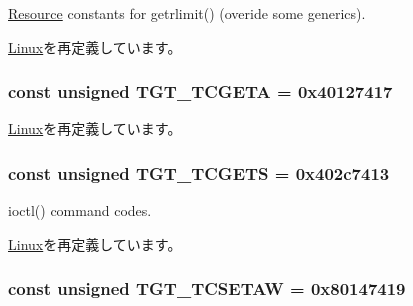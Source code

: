\hyperlink{classResource}{Resource} constants for getrlimit() (overide some generics). 

\hyperlink{classLinux_af16b609dcc51ebef365e8258e28d777c}{Linux}を再定義しています。\hypertarget{classAlphaLinux_a804fc265279c5dbd78e0f95da998b267}{
\subsubsection[{TGT\_\-TCGETA}]{\setlength{\rightskip}{0pt plus 5cm}const unsigned {\bf TGT\_\-TCGETA} = 0x40127417}}
\label{classAlphaLinux_a804fc265279c5dbd78e0f95da998b267}


\hyperlink{classLinux_a804fc265279c5dbd78e0f95da998b267}{Linux}を再定義しています。\hypertarget{classAlphaLinux_a50e5d880569ec2cb9a2f3d4aaa55cc64}{
\subsubsection[{TGT\_\-TCGETS}]{\setlength{\rightskip}{0pt plus 5cm}const unsigned {\bf TGT\_\-TCGETS} = 0x402c7413}}
\label{classAlphaLinux_a50e5d880569ec2cb9a2f3d4aaa55cc64}


ioctl() command codes. 

\hyperlink{classLinux_a50e5d880569ec2cb9a2f3d4aaa55cc64}{Linux}を再定義しています。\hypertarget{classAlphaLinux_a96e06e042526ea5e89c4e8a020636c52}{
\subsubsection[{TGT\_\-TCSETAW}]{\setlength{\rightskip}{0pt plus 5cm}const unsigned {\bf TGT\_\-TCSETAW} = 0x80147419}}
\label{classAlphaLinux_a96e06e042526ea5e89c4e8a020636c52}


